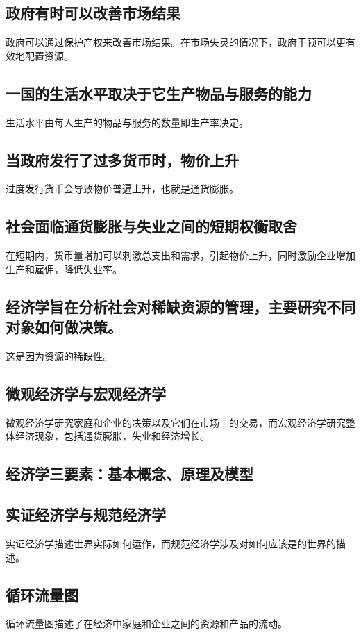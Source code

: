 \documentclass[12pt, a4paper]{article}
\begin{document}
\subsection{政府有时可以改善市场结果}
政府可以通过保护产权来改善市场结果。在市场失灵的情况下，政府干预可以更有效地配置资源。

\subsection{一国的生活水平取决于它生产物品与服务的能力}
生活水平由每人生产的物品与服务的数量即生产率决定。

\subsection{当政府发行了过多货币时，物价上升}
过度发行货币会导致物价普遍上升，也就是通货膨胀。

\subsection{社会面临通货膨胀与失业之间的短期权衡取舍}
在短期内，货币量增加可以刺激总支出和需求，引起物价上升，同时激励企业增加生产和雇佣，降低失业率。

\subsection{经济学旨在分析社会对稀缺资源的管理，主要研究不同对象如何做决策。}
这是因为资源的稀缺性。

\subsection{微观经济学与宏观经济学}
微观经济学研究家庭和企业的决策以及它们在市场上的交易，而宏观经济学研究整体经济现象，包括通货膨胀，失业和经济增长。

\subsection{经济学三要素：基本概念、原理及模型}

\subsection{实证经济学与规范经济学}
实证经济学描述世界实际如何运作，而规范经济学涉及对如何应该是的世界的描述。

\subsection{循环流量图}
循环流量图描述了在经济中家庭和企业之间的资源和产品的流动。
\end{document}
